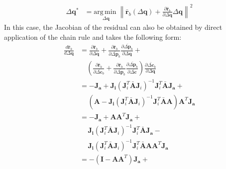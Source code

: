 \begin{equation}
    \begin{aligned}
        \Delta\mathbf{q}^* & = \underset{\Delta\mathbf{q}}{\mathrm{arg\,min\;}}  \left\| \bar{\mathbf{r}}_b(\Delta\mathbf{q}) + \frac{\partial \bar{\mathbf{r}}_b}{\partial\Delta\mathbf{q}} \Delta\mathbf{q} \right\|^2
    \label{eq:bidirectional_wiberg_problem2}
    \end{aligned}
\end{equation}
In this case, the Jacobian of the residual can also be obtained by direct application of the chain rule and takes the following form:
\begin{equation}
    \begin{aligned}
        \frac{d \bar{\mathbf{r}}_b}{d \Delta \mathbf{q}} & = \frac{\partial \bar{\mathbf{r}}_b}{\partial \Delta \mathbf{q}} + \frac{\partial \bar{\mathbf{r}}_b}{\partial \bar{\Delta \mathbf{p}}_b} \frac{\partial \bar{\Delta \mathbf{p}}_b}{\partial \Delta \mathbf{q}} +
        \\
        & \quad \left( \frac{\partial\bar{\mathbf{r}}_b}{\partial \bar{\Delta \mathbf{c}}_b} + \frac{\partial \bar{\mathbf{r}}_b}{\partial \bar{\Delta \mathbf{p}}_b} \frac{\partial \bar{\Delta \mathbf{p}}_b}{\partial \bar{\Delta \mathbf{c}}} \right) \frac{\partial \bar{\Delta \mathbf{c}}_b}{\partial \Delta \mathbf{q}}
        \\
        & = - \mathbf{J}_{\mathbf{a}} + \mathbf{J}_{\mathbf{i}} \left( \mathbf{J}_i^T \bar{\mathbf{A}} \mathbf{J}_i \right)^{-1} \mathbf{J}_i^T \bar{\mathbf{A}} \mathbf{J}_{\mathbf{a}} +
        \\
        & \quad \, \left(\mathbf{A} - \mathbf{J}_{\mathbf{i}} \left( \mathbf{J}_i^T \bar{\mathbf{A}} \mathbf{J}_i \right)^{-1} \mathbf{J}_i^T \bar{\mathbf{A}} \mathbf{A} \right) \mathbf{A}^T \mathbf{J}_{\mathbf{a}}
        \\
        & = - \mathbf{J}_{\mathbf{a}} + \mathbf{A}\mathbf{A}^T \mathbf{J}_{\mathbf{a}} +
        \\
        & \quad \, \mathbf{J}_{\mathbf{i}} \left( \mathbf{J}_i^T \bar{\mathbf{A}} \mathbf{J}_i \right)^{-1} \mathbf{J}_i^T \bar{\mathbf{A}} \mathbf{J}_{\mathbf{a}} -
        \\
        & \quad \, \mathbf{J}_{\mathbf{i}} \left( \mathbf{J}_i^T \bar{\mathbf{A}} \mathbf{J}_i \right)^{-1} \mathbf{J}_i^T \bar{\mathbf{A}} \mathbf{A} \mathbf{A}^T \mathbf{J}_{\mathbf{a}}
        \\
        & = - \left( \mathbf{I} - \mathbf{A}\mathbf{A}^T \right) \mathbf{J}_{\mathbf{a}} +

\end{aligned}
\end{equation}
